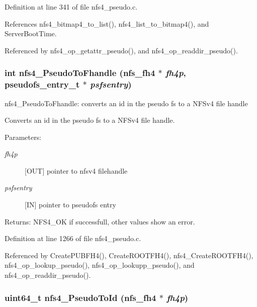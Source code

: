 Definition at line 341 of file nfs4\_\-pseudo.c.

References nfs4\_\-bitmap4\_\-to\_\-list(), nfs4\_\-list\_\-to\_\-bitmap4(), and Server\-Boot\-Time.

Referenced by nfs4\_\-op\_\-getattr\_\-pseudo(), and nfs4\_\-op\_\-readdir\_\-pseudo().
\subsubsection{\setlength{\rightskip}{0pt plus 5cm}int nfs4\_\-Pseudo\-To\-Fhandle (nfs\_\-fh4 $\ast$ {\em fh4p}, pseudofs\_\-entry\_\-t $\ast$ {\em psfsentry})}\label{nfs4__pseudo_8c_a20}


nfs4\_\-Pseudo\-To\-Fhandle: converts an id in the pseudo fs to a NFSv4 file handle

Converts an id in the pseudo fs to a NFSv4 file handle.

\begin{Desc}
\item[Parameters:]
\begin{description}
\item[{\em fh4p}][OUT] pointer to nfsv4 filehandle \item[{\em psfsentry}][IN] pointer to pseudofs entry\end{description}
\end{Desc}
\begin{Desc}
\item[Returns:]NFS4\_\-OK if successfull, other values show an error. \end{Desc}


Definition at line 1266 of file nfs4\_\-pseudo.c.

Referenced by Create\-PUBFH4(), Create\-ROOTFH4(), nfs4\_\-Create\-ROOTFH4(), nfs4\_\-op\_\-lookup\_\-pseudo(), nfs4\_\-op\_\-lookupp\_\-pseudo(), and nfs4\_\-op\_\-readdir\_\-pseudo().
\subsubsection{\setlength{\rightskip}{0pt plus 5cm}uint64\_\-t nfs4\_\-Pseudo\-To\-Id (nfs\_\-fh4 $\ast$ {\em fh4p})}\label{nfs4__pseudo_8c_a15}


